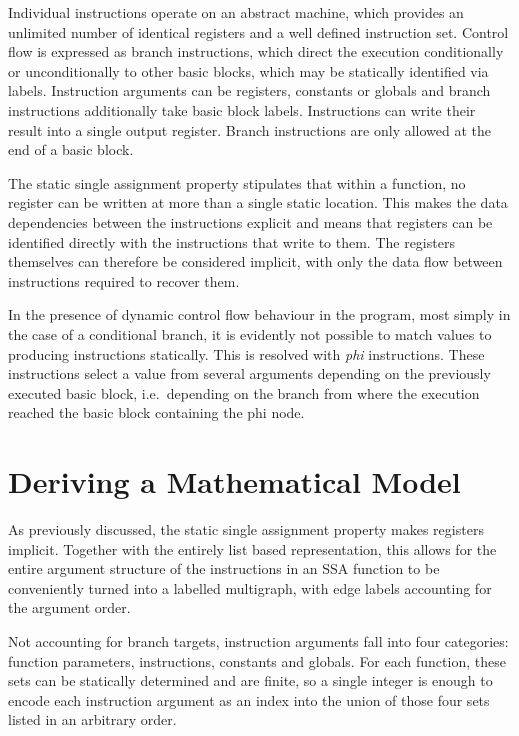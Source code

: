     Individual instructions operate on an abstract machine, which provides an
    unlimited number of identical registers and a well defined instruction set.
    Control flow is expressed as branch instructions, which direct the execution
    conditionally or unconditionally to other basic blocks, which may be
    statically identified via labels.
    Instruction arguments can be registers, constants or globals and branch
    instructions additionally take basic block labels.
    Instructions can write their result into a single output register.
    Branch instructions are only allowed at the end of a basic block.

    The static single assignment property stipulates that within a function,
    no register can be written at more than a single static location.
    This makes the data dependencies between the instructions explicit and
    means that registers can be identified directly with the instructions that
    write to them.
    The registers themselves can therefore be considered implicit, with only the
    data flow between instructions required to recover them.

    In the presence of dynamic control flow behaviour in the program, most
    simply in the case of a conditional branch, it is evidently not possible to
    match values to producing instructions statically.
    This is resolved with {\em phi} instructions.
    These instructions select a value from several arguments depending on the
    previously executed basic block, i.e.\ depending on the branch from where
    the execution reached the basic block containing the phi node.


\section{Deriving a Mathematical Model}
    As previously discussed, the static single assignment property makes
    registers implicit.
    Together with the entirely list based representation, this allows for the
    entire argument structure of the instructions in an SSA function to be
    conveniently turned into a labelled multigraph, with edge labels accounting
    for the argument order.

    Not accounting for branch targets, instruction arguments fall into four
    categories: function parameters, instructions, constants and globals.
    For each function, these sets can be statically determined and are finite,
    so a single integer is enough to encode each instruction argument as an
    index into the union of those four sets listed in an arbitrary order.

